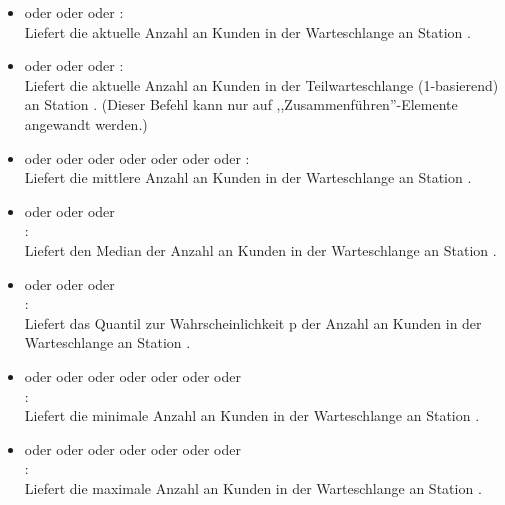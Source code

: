 \begin{itemize}    

\item
{} oder  oder  oder :\\
Liefert die aktuelle Anzahl an Kunden in der Warteschlange an Station .

\item
{} oder  oder  oder :\\
Liefert die aktuelle Anzahl an Kunden in der Teilwarteschlange  (1-basierend) an Station .
(Dieser Befehl kann nur auf ,,Zusammenführen''-Elemente angewandt werden.)
 
\item
{} oder  oder  oder  oder  oder  oder  oder :\\
Liefert die mittlere Anzahl an Kunden in der Warteschlange an Station .

\item
{} oder  oder  oder\\
:\\
Liefert den Median der Anzahl an Kunden in der Warteschlange an Station .

\item
{} oder  oder  oder\\
:\\
Liefert das Quantil zur Wahrscheinlichkeit p der Anzahl an Kunden in der Warteschlange an Station .

\item
{} oder  oder  oder  oder  oder  oder  oder\\
:\\
Liefert die minimale Anzahl an Kunden in der Warteschlange an Station .

\item
{} oder  oder  oder  oder  oder  oder  oder\\
:\\
Liefert die maximale Anzahl an Kunden in der Warteschlange an Station .


\end{itemize}
